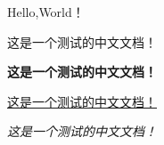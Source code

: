 \documentclass[12pt,a4paper]{ctexart}
\begin{document}
 

Hello,World！  

这是一个测试的中文文档！  

\textbf{这是一个测试的中文文档！}

\underline{这是一个测试的中文文档！}

\emph{这是一个测试的中文文档！}
\end{document}
